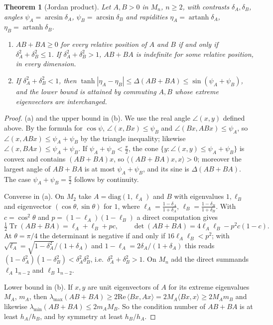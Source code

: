 \documentclass[11pt]{article}
\DeclareMathOperator{\Tr}{Tr}
\renewcommand{\Re}{\mathrm{Re}\,}
\theoremstyle{plain}
\newtheorem{theorem}{Theorem}[section]
\theoremstyle{definition}
\theoremstyle{remark}
\begin{document}
\begin{theorem}[Jordan product]\label{thm:jordan}
Let $A,B>0$ in $M_n$, $n\ge2$, with contrasts $\delta_A,\delta_B$, angles $\psi_A=\arcsin\delta_A$, $\psi_B=\arcsin\delta_B$
and rapidities $\eta_A=\operatorname{artanh}\delta_A$, $\eta_B=\operatorname{artanh}\delta_B$.
\begin{enumerate}
\item[(a)] $AB+BA\ge0$ for every relative position of $A$ and $B$ if and only if $\delta_A^2+\delta_B^2\le1$. If
$\delta_A^2+\delta_B^2>1$, $AB+BA$ is indefinite for some relative position, in every dimension.
\item[(b)] If $\delta_A^2+\delta_B^2<1$, then $\tanh|\eta_A-\eta_B|\le\Delta(AB+BA)\le\sin(\psi_A+\psi_B)$, and the lower
bound is attained by commuting $A,B$ whose extreme eigenvectors are interchanged.
\end{enumerate}
\end{theorem}
\begin{proof}
(a) and the upper bound in (b). We use the real angle $\angle(x,y)$ defined above. By the formula for $\cos\psi$,
$\angle(x,Bx)\le\psi_B$ and $\angle(Bx,ABx)\le\psi_A$, so $\angle(x,ABx)\le\psi_A+\psi_B$ by the triangle inequality;
likewise $\angle(x,BAx)\le\psi_A+\psi_B$. If $\psi_A+\psi_B<\frac\pi2$, the cone $\{y:\angle(x,y)\le\psi_A+\psi_B\}$ is
convex and contains $(AB+BA)x$, so $\langle(AB+BA)x,x\rangle>0$; moreover the largest angle of $AB+BA$ is at most
$\psi_A+\psi_B$, and its sine is $\Delta(AB+BA)$. The case $\psi_A+\psi_B=\frac\pi2$ follows by continuity.

Converse in (a). On $M_2$ take $A=\mathrm{diag}(1,\ell_A)$ and $B$ with eigenvalues $1,\ell_B$ and eigenvector
$(\cos\theta,\sin\theta)$ for $1$, where $\ell_A=\frac{1-\delta_A}{1+\delta_A}$, $\ell_B=\frac{1-\delta_B}{1+\delta_B}$. With
$c=\cos^2\theta$ and $p=(1-\ell_A)(1-\ell_B)$ a direct computation gives
\[
  \tfrac12\Tr(AB+BA)=\ell_A+\ell_B+pc,\qquad\det(AB+BA)=4\ell_A\ell_B-p^2c(1-c).
\]
At $\theta=\pi/4$ the determinant is negative if and only if $16\ell_A\ell_B<p^2$; with
$\sqrt{\ell_A}=\sqrt{1-\delta_A^2}/(1+\delta_A)$ and $1-\ell_A=2\delta_A/(1+\delta_A)$ this reads $(1-\delta_A^2)(1-\delta_B^2)<\delta_A^2\delta_B^2$, i.e.\ $\delta_A^2+\delta_B^2>1$.
On $M_n$ add the direct summands $\ell_A1_{n-2}$ and $\ell_B1_{n-2}$.

Lower bound in (b). If $x,y$ are unit eigenvectors of $A$ for its extreme eigenvalues $M_A$, $m_A$, then
$\lambda_{\max}(AB+BA)\ge2\Re\langle Bx,Ax\rangle=2M_A\langle Bx,x\rangle\ge2M_Am_B$ and likewise
$\lambda_{\min}(AB+BA)\le2m_AM_B$. So the condition number of $AB+BA$ is at least $h_A/h_B$, and by symmetry at least
$h_B/h_A$.
\end{proof}
\end{document}
